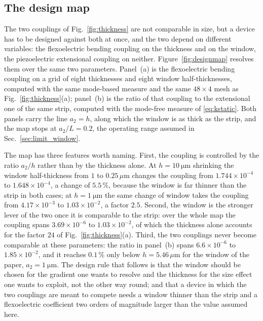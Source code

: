 \FloatBarrier
\subsection{The design map}
\label{sec:designmap}

The two couplings of Fig.~\ref{fig:thickness} are not comparable in size, but a
device has to be designed against both at once, and the two depend on different
variables: the flexoelectric bending coupling on the thickness and on the
window, the piezoelectric extensional coupling on neither. Figure~\ref{fig:designmap}
resolves them over the same two parameters. Panel~(a) is the flexoelectric
bending coupling on a grid of eight thicknesses and eight window
half-thicknesses, computed with the same mode-based measure and the same
$48\times4$ mesh as Fig.~\ref{fig:thickness}(a); panel~(b) is the ratio of that
coupling to the extensional one of the same strip, computed with the mode-free
measure of \eqref{eq:kstatic}. Both panels carry the line $a_2=h$, along which
the window is as thick as the strip, and the map stops at $a_2/L=0.2$, the
operating range assumed in Sec.~\ref{sec:limit_window}.

The map has three features worth naming. First, the coupling is controlled by
the ratio $a_2/h$ rather than by the thickness alone. At
$h=\SI{10}{\micro\metre}$ shrinking the window half-thickness from $1$ to
$0.25\,\mu$m changes the coupling from $1.744\times10^{-4}$ to
$1.648\times10^{-4}$, a change of $5.5\,\%$, because the window is far thinner
than the strip in both cases; at $h=\SI{1}{\micro\metre}$ the same change of
window takes the coupling from $4.17\times10^{-3}$ to $1.03\times10^{-2}$, a
factor $2.5$. Second, the window is the stronger lever of the two once it is
comparable to the strip: over the whole map the coupling spans
$3.69\times10^{-6}$ to $1.03\times10^{-2}$, of which the thickness alone
accounts for the factor $24$ of Fig.~\ref{fig:thickness}(a).
Third, the two couplings never become comparable at these parameters: the ratio
in panel~(b) spans $6.6\times10^{-6}$ to $1.85\times10^{-2}$, and it reaches
$0.1\,\%$ only below $h=5.46\,\mu$m for the window of the paper,
$a_2=\SI{1}{\micro\metre}$. The design rule that follows is that the window
should be chosen for the gradient one wants to resolve and the thickness for
the size effect one wants to exploit, not the other way round; and that a
device in which the two couplings are meant to compete needs a window thinner
than the strip and a flexoelectric coefficient two orders of magnitude larger
than the value assumed here.


